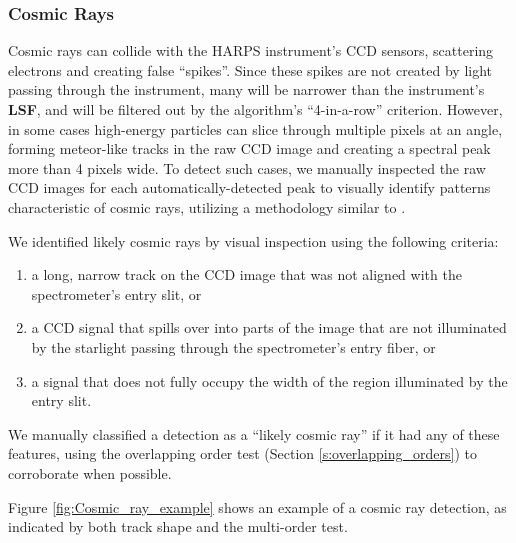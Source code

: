 \documentclass[linenumbers]{aastex701}
\providecommand{\DIFadd}[1]{{\bf #1}} %
\providecommand{\DIFaddbegin}{} %
\providecommand{\DIFaddend}{} %
\begin{document}
\subsubsection{Cosmic Rays}
\label{s:cosmic}
Cosmic rays can collide with the HARPS instrument's CCD sensors, scattering electrons and creating false  \DIFaddbegin \enquote{spikes}\DIFaddend . Since these spikes are not created by light passing through the instrument, many will be narrower than the instrument's  \DIFaddbegin \DIFadd{LSF}\DIFaddend , and will be filtered out by the algorithm's  \DIFaddbegin \enquote{4-in-a-row} \DIFaddend criterion.  However, in some cases high-energy particles can slice through multiple pixels at an angle, forming meteor-like tracks in the raw CCD image and creating a spectral peak more than 4 pixels wide.  To detect such cases, we manually inspected the raw CCD images for each automatically-detected peak to visually identify patterns characteristic of cosmic rays, utilizing a methodology similar to \cite{Tellis_2017}. 

We identified likely cosmic rays by visual inspection using the following criteria:
\begin{enumerate}
    \item a long, narrow track on the CCD image that was not aligned with the spectrometer's entry slit, or
    \item a CCD signal that spills over into parts of the image that are not illuminated by the starlight passing through the spectrometer's entry fiber, or
    \item a signal that does not fully occupy the width of the region illuminated by the entry slit.
\end{enumerate}
We manually classified a detection as a  \DIFaddbegin \enquote{likely cosmic ray} \DIFaddend if it had any of these features, using the overlapping order test (Section \ref{s:overlapping_orders}) to corroborate when possible.

Figure \ref{fig:Cosmic_ray_example} shows an example of a cosmic ray detection, as indicated by both track shape and the multi-order test.
\end{document}
